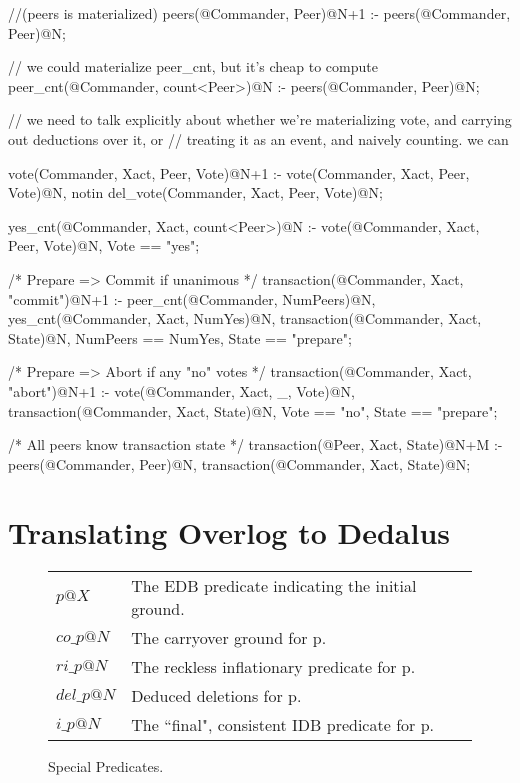\begin{Dedalus}
//(peers is materialized)
peers(@Commander, Peer)@N+1 :-
    peers(@Commander, Peer)@N;

// we could materialize peer_cnt, but it's cheap to compute
peer_cnt(@Commander, count<Peer>)@N :-
  peers(@Commander, Peer)@N;

// we need to talk explicitly about whether we're materializing vote, and carrying out deductions over it, or 
// treating it as an event, and naively counting.  we can 

vote(Commander, Xact, Peer, Vote)@N+1 :-
    vote(Commander, Xact, Peer, Vote)@N,
    notin del_vote(Commander, Xact, Peer, Vote)@N;

yes_cnt(@Commander, Xact, count<Peer>)@N :-
  vote(@Commander, Xact, Peer, Vote)@N,
  Vote == "yes";

/* Prepare => Commit if unanimous */
transaction(@Commander, Xact, "commit")@N+1 :-
  peer_cnt(@Commander, NumPeers)@N,
  yes_cnt(@Commander, Xact, NumYes)@N,
  transaction(@Commander, Xact, State)@N,
  NumPeers == NumYes, State == "prepare";

/* Prepare => Abort if any "no" votes */
transaction(@Commander, Xact, "abort")@N+1 :-
  vote(@Commander, Xact, _, Vote)@N,
  transaction(@Commander, Xact, State)@N,
  Vote == "no", State == "prepare";

/* All peers know transaction state */
transaction(@Peer, Xact, State)@N+M :-
  peers(@Commander, Peer)@N,
  transaction(@Commander, Xact, State)@N;
\end{Dedalus}

\section{Translating Overlog to Dedalus}

\begin{figure}[t]
\begin{tabular}{ll} \hline
$p@X$ & The EDB predicate indicating the initial ground. \\
$co\_p@N$ & The carryover ground for p. \\
$ri\_p@N$ & The reckless inflationary predicate for p. \\
$del\_p@N$ & Deduced deletions for p. \\
$i\_p@N$ & The ``final", consistent IDB predicate for p. \\ \hline
\end{tabular}
\caption{Special Predicates.}
\label{fig:overlogtab}
\end{figure}


